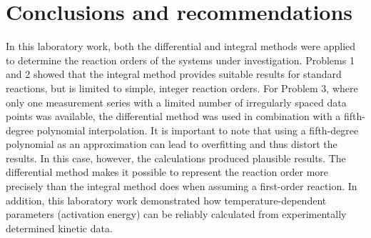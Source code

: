 \section*{Conclusions and recommendations}

In this laboratory work, both the differential and integral methods were
applied to determine the reaction orders of the systems under investigation.
Problems 1 and 2 showed that the integral method provides suitable results for
standard reactions, but is limited to simple, integer reaction orders. For
Problem 3, where only one measurement series with a limited number of
irregularly spaced data points was available, the differential method was
used in combination with a fifth-degree polynomial interpolation. It is
important to note that using a fifth-degree polynomial as an approximation
can lead to overfitting and thus distort the results. In this case, however,
the calculations produced plausible results. The differential method makes it
possible to represent the reaction order more precisely than the integral
method does when assuming a first-order reaction. In addition, this
laboratory work demonstrated how temperature-dependent parameters
(activation energy) can be reliably calculated from experimentally
determined kinetic data.